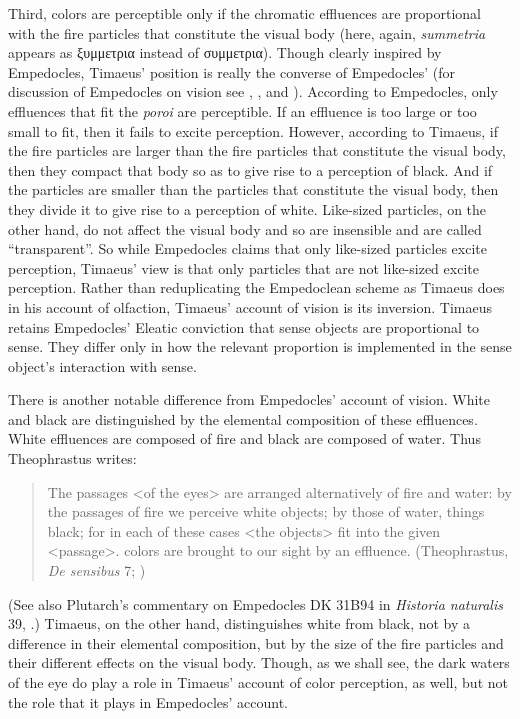 Third, colors are perceptible only if the chromatic effluences are proportional with the fire particles that constitute the visual body (here, again, \emph{summetria} appears as {\sbl ξυμ\-μετρια} instead of {\sbl συμμετρια}). Though clearly inspired by Empedocles, Timaeus' position is really the converse of Empedocles' (for discussion of Empedocles on vision see \citealt{Sedley:1992uq}, \citealt{Ierodiakonou:2005fk}, and \citealt[chapter 1]{Kalderon:2015fr}). According to Empedocles, only effluences that fit the \emph{poroi} are perceptible. If an effluence is too large or too small to fit, then it fails to excite perception. However, according to Timaeus, if the fire particles are larger than the fire particles that constitute the visual body, then they compact that body so as to give rise to a perception of black. And if the particles are smaller than the particles that constitute the visual body, then they divide it to give rise to a perception of white. Like-sized particles, on the other hand, do not affect the visual body and so are insensible and are called ``transparent''. So while Empedocles claims that only like-sized particles excite perception, Timaeus' view is that only particles that are not like-sized excite perception. Rather than reduplicating the Empedoclean scheme as Timaeus does in his account of olfaction, Timaeus' account of vision is its inversion. Timaeus retains Empedocles' Eleatic conviction that sense objects are proportional to sense. They differ only in how the relevant proportion is implemented in the sense object's interaction with sense.

There is another notable difference from Empedocles' account of vision. White and black are distinguished by the elemental composition of these effluences. White effluences are composed of fire and black are composed of water. Thus Theophrastus writes: 
\begin{quote}
	The passages <of the eyes> are arranged alternatively of fire and water: by the passages of fire we perceive white objects; by those of water, things black; for in each of these cases <the objects> fit into the given <passage>. colors are brought to our sight by an effluence. (Theophrastus, \emph{De sensibus} 7; \citealt[71--3]{Stratton:1917vn})
\end{quote}
(See also Plutarch's commentary on Empedocles DK 31B94 in \emph{Historia naturalis} 39, \citealt[CTXT-87 137--8]{Inwood:2001ve}.) Timaeus, on the other hand, distinguishes white from black, not by a difference in their elemental composition, but by the size of the fire particles and their different effects on the visual body. Though, as we shall see, the dark waters of the eye do play a role in Timaeus' account of color perception, as well, but not the role that it plays in Empedocles' account.

